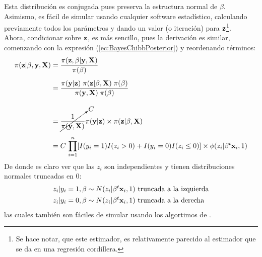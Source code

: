 \documentclass[../Main/Main.tex]{subfiles}
\begin{document}
Esta distribución es conjugada pues preserva la estructura normal de $\beta$. Asimismo, es fácil de simular usando cualquier software estadístico, calculando previamente todos los parámetros y dando un valor (o iteración) para $\mathbf{z}$\footnote{Se hace notar, que este estimador, es relativamente parecido al estimador que se da en una regresión cordillera.}.\\

Ahora, condicionar sobre $\mathbf{z}$, es más sencillo, pues la derivación es similar, comenzando con la expresión (\ref{ec:BayesChibbPosterior}) y reordenando términos:
\begin{align}
	\pi(\mathbf{z}|\beta,\mathbf{y},\mathbf{X})
	& = \dfrac{\pi(\mathbf{z}, \beta| \mathbf{y}, \mathbf{X})}{\pi(\beta)} \nonumber \\[5pt]
	& = \dfrac{\pi(\mathbf{y} | \mathbf{z})\;\pi(\mathbf{z}|\beta,\mathbf{X}) \; \pi(\beta)}			{\pi(\mathbf{y}, \mathbf{X}) \; \pi(\beta)} \nonumber \\[10pt]
	& = \cancelto{C}{\dfrac{1}{\pi(\mathbf{y}, \mathbf{X})}}\pi(\mathbf{y} | \mathbf{z}) \times \pi(\mathbf{z}|\beta,\mathbf{X}) \nonumber \\[5pt]
	& = C \, \prod_{i = 1}^n[I(y_i = 1)I(z_i > 0) + I(y_i = 0)I(z_i \leq 0)] \times \phi(z_i|\beta^t\mathbf{x}_i,1) \label{ec:BayesChibbZCond}
\end{align}
De donde es claro ver que las $z_i$ son independientes y tienen distribuciones normales truncadas en $0$:
\begin{align}
	z_i|y_i = 1,\beta &\sim N(z_i|\beta^t\mathbf{x}_i,1) \text{ truncada a la izquierda} \label{ec:SimZ}\\
	z_i|y_i = 0,\beta &\sim N(z_i|\beta^t\mathbf{x}_i,1) \text{ truncada a la derecha} \nonumber
\end{align}
las cuales también son fáciles de simular usando los algortimos de \autocite{devroye1986non}. \\
\end{document}
